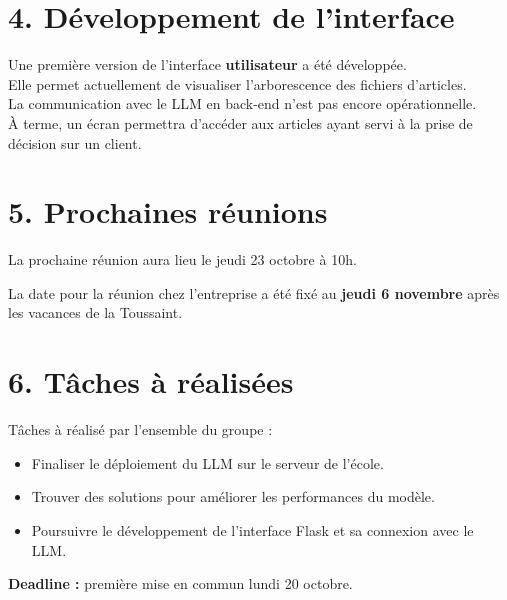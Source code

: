 \documentclass[a4paper,11pt]{article}
\begin{document}
    \section*{4. Développement de l’interface}
    Une première version de l’interface \textbf{utilisateur} a été développée. \\
    Elle permet actuellement de visualiser l’arborescence des fichiers d’articles. \\
    La communication avec le LLM en back-end n’est pas encore opérationnelle. \\
    À terme, un écran permettra d’accéder aux articles ayant servi à la prise de décision sur un client.

    \section*{5. Prochaines réunions}
    La prochaine réunion aura lieu le jeudi 23 octobre à 10h.

    La date pour la réunion chez l'entreprise a été fixé au \textbf{jeudi 6 novembre} après les vacances de la Toussaint.

    \section*{6. Tâches à réalisées}
    Tâches à réalisé par l'ensemble du groupe :
    \begin{itemize}
        \item Finaliser le déploiement du LLM sur le serveur de l’école.
        \item Trouver des solutions pour améliorer les performances du modèle.
        \item Poursuivre le développement de l’interface Flask et sa connexion avec le LLM.

    \end{itemize}
    \textbf{Deadline :} première mise en commun lundi 20 octobre.
\end{document}
